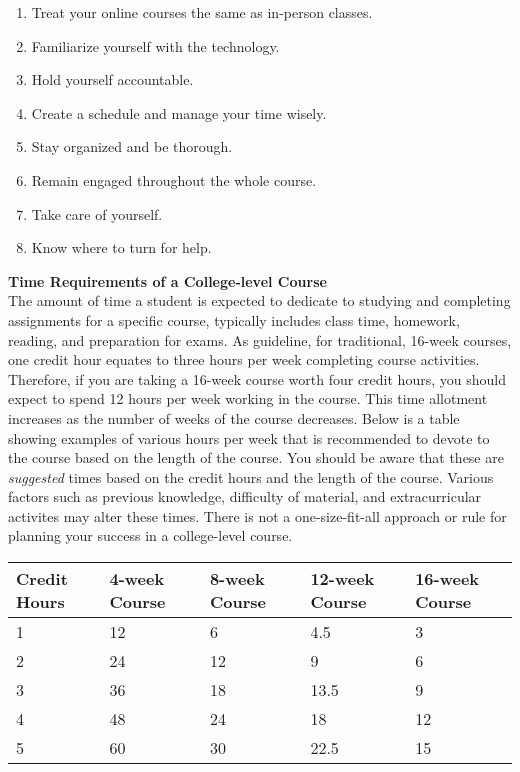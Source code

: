 \documentclass{article}
\renewenvironment{framed}[1][]{%
  \def\FrameCommand{%
    \hspace{1pt}%
    {\color{mybordercolor}\vrule width 2pt} %
    \hspace{1pt}%
    \fboxsep=\FrameSep%
    \colorbox{mybgcolor}%
  }%
  \MakeFramed {\advance\hsize-\width \FrameRestore}%
}{%
  \endMakeFramed
}
\begin{document}
\begin{enumerate}
\item Treat your online courses the same as in-person classes.
\item Familiarize yourself with the technology.
\item Hold yourself accountable.
\item Create a schedule and manage your time wisely.
\item Stay organized and be thorough.
\item Remain engaged throughout the whole course.
\item Take care of yourself.
\item Know where to turn for help.
\end{enumerate}

\begin{framed}
\textbf{Time Requirements of a College-level Course}\\
The amount of time a student is expected to dedicate to studying and completing assignments for a specific course, typically includes class time, homework, reading, and preparation for exams. As guideline, for traditional, 16-week courses, one credit hour equates to three hours per week completing course activities. Therefore, if you are taking a 16-week course worth four credit hours, you should expect to spend 12 hours per week working in the course. This time allotment increases as the number of weeks of the course decreases. Below is a table showing examples of various hours per week that is recommended to devote to the course based on the length of the course. You should be aware that these are \textit{suggested} times based on the credit hours and the length of the course. Various factors such as previous knowledge, difficulty of material, and extracurricular activites may alter these times. There is not a one-size-fit-all approach or rule for planning your success in a college-level course.

\bigskip\noindent
\begin{tabular}{p{}p{}p{}p{}p{}}
\toprule
Credit Hours & 4-week Course & 8-week Course & 12-week Course & 16-week Course \\
\hline
1 & 12 & 6 & 4.5 & 3 \\
2 & 24 & 12 & 9 & 6 \\
3 & 36 & 18 & 13.5 & 9 \\
4 & 48 & 24 & 18 & 12 \\
5 & 60 & 30 & 22.5 & 15 \\
\bottomrule
\end{tabular}

\bigskip
\end{framed}
\end{document}

